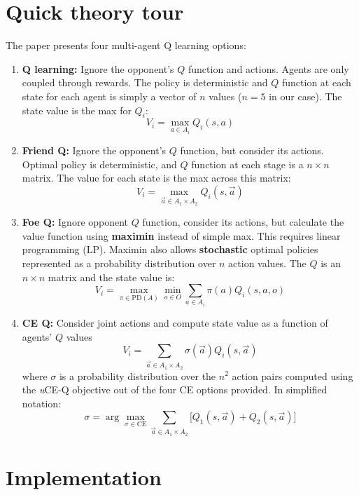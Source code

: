 \documentclass[conference]{IEEEtran}
\begin{document}
\section{Quick theory tour}
The paper presents four multi-agent Q learning options:
\begin{enumerate}
\item {\bf Q learning:} Ignore the opponent's $Q$ function and actions. Agents are only coupled through rewards. The policy is deterministic and $Q$ function at each state for each agent is simply a vector of $n$ values ($n=5$ in our case). The state value is the max for $Q_i$: 
\begin{equation}
V_i =\max_{a\in A_i} Q_i(s,a)
\end{equation} 
%
\item {\bf Friend Q: } Ignore the opponent's $Q$ function, but consider its actions. Optimal policy is deterministic, and $Q$ function at each stage is a $n\times n$ matrix. The value for each state is the max across this matrix:
\begin{equation}
V_i = \max_{\vec{a}\in A_1\times A_2} Q_i(s, \vec{a})
\end{equation}
%
\item {\bf Foe Q: } Ignore opponent $Q$ function, consider its actions, but calculate the value function using {\bf maximin} instead of simple max. This requires linear programming (LP). Maximin also allows {\bf stochastic} optimal policies represented as a probability distribution over $n$ action values. The $Q$ is an $n\times n$ matrix and the state value is: 
%
\begin{equation}
V_i = \max_{\pi\in\text{PD}(A)}\min_{o\in O}\sum_{a\in A_i}\pi(a) Q_i(s, a, o)
\end{equation}
%
\item {\bf CE Q: } Consider joint actions and compute state value as a function of agents' $Q$ values
%
\begin{equation}
V_i = \sum_{\vec{a}\in A_1\times A_2} \sigma(\vec{a})Q_i(s, \vec{a})
\end{equation}
where $\sigma$ is a probability distribution over the $n^2$ action pairs computed using the {\em u}CE-Q objective out of the four CE options provided. In simplified notation:
\begin{equation}
\sigma = \arg \max_{\sigma\in\text{CE}} \sum_{\vec{a}\in A_1 \times A_2} \big[Q_1(s, \vec{a}) + Q_2(s, \vec{a})\big]
\end{equation}
\end{enumerate}
\section{Implementation}
\end{document}
